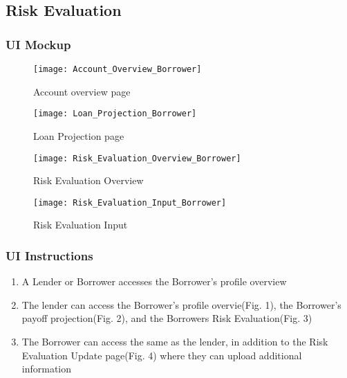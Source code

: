 \subsection{Risk Evaluation}

\subsubsection{UI Mockup}


\begin{figure}[H]
\centering
\texttt{[image: Account\_Overview\_Borrower]}
\caption{Account overview page}
\end{figure}

\begin{figure}[H]
\centering
\texttt{[image: Loan\_Projection\_Borrower]}
\caption{Loan Projection page}
\end{figure}

\begin{figure}[H]
\centering
\texttt{[image: Risk\_Evaluation\_Overview\_Borrower]}
\caption{Risk Evaluation Overview}
\end{figure}

\begin{figure}[H]
\centering
\texttt{[image: Risk\_Evaluation\_Input\_Borrower]}
\caption{Risk Evaluation Input}
\end{figure}



\subsubsection{UI Instructions}

\begin{enumerate}
	\item A Lender or Borrower accesses the Borrower's profile overview
	\item The lender can access the Borrower's profile overvie(Fig. 1), the Borrower's payoff projection(Fig. 2), and the Borrowers Risk Evaluation(Fig. 3)
	\item The Borrower can access the same as the lender, in addition to the Risk Evaluation Update page(Fig. 4) where they can upload additional information
\end{enumerate}
